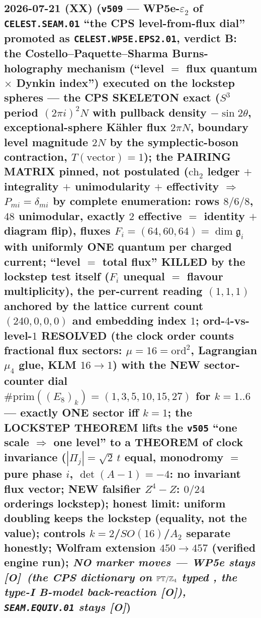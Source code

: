 \documentclass[11pt]{article}
\providecommand{\mO}{\textbf{[O]}}\providecommand{\mX}{\textbf{[X]}}
\begin{document}
\subsection*{2026-07-21 (XX) (\texttt{v509} --- WP5e-$\varepsilon_2$ of \texttt{CELEST.SEAM.01} ``the CPS level-from-flux dial'' promoted as \texttt{CELEST.WP5E.EPS2.01}, verdict B: the Costello--Paquette--Sharma Burns-holography mechanism (``level $=$ flux quantum $\times$ Dynkin index'') executed on the lockstep spheres --- the CPS SKELETON exact ($S^3$ period $(2\pi i)^2N$ with pullback density $-\sin2\theta$, exceptional-sphere K\"ahler flux $2\pi N$, boundary level magnitude $2N$ by the symplectic-boson contraction, $T(\text{vector})=1$); the PAIRING MATRIX pinned, not postulated ($\mathrm{ch}_2$ ledger $+$ integrality $+$ unimodularity $+$ effectivity $\Rightarrow$ $P_{mi}=\delta_{mi}$ by complete enumeration: rows $8/6/8$, $48$ unimodular, exactly $2$ effective $=$ identity $+$ diagram flip), fluxes $F_i=(64,60,64)=\dim\mathfrak g_i$ with uniformly ONE quantum per charged current; ``level $=$ total flux'' KILLED by the lockstep test itself ($F_i$ unequal $=$ flavour multiplicity), the per-current reading $(1,1,1)$ anchored by the lattice current count $(240,0,0,0)$ and embedding index $1$; ord-$4$-vs-level-$1$ RESOLVED (the clock order counts fractional flux sectors: $\mu=16=\mathrm{ord}^2$, Lagrangian $\mu_4$ glue, KLM $16\to1$) with the NEW sector-counter dial $\#\mathrm{prim}((E_8)_k)=(1,3,5,10,15,27)$ for $k=1..6$ --- exactly ONE sector iff $k=1$; the LOCKSTEP THEOREM lifts the \texttt{v505} ``one scale $\Rightarrow$ one level'' to a THEOREM of clock invariance ($|\Pi_j|=\sqrt2\,t$ equal, monodromy $=$ pure phase $i$, $\det(A{-}1)=-4$: no invariant flux vector; NEW falsifier $Z^4{-}Z$: $0/24$ orderings lockstep); honest limit: uniform doubling keeps the lockstep (equality, not the value); controls $k{=}2$/$SO(16)$/$A_2$ separate honestly; Wolfram extension $450\to457$ (verified engine run); \emph{NO marker moves --- WP5e stays \mO\ (the CPS dictionary on $\mathbb{PT}/\mathbb{Z}_4$ typed \mC, the type-I B-model back-reaction \mO), \texttt{SEAM.EQUIV.01} stays \mO})}
\end{document}
